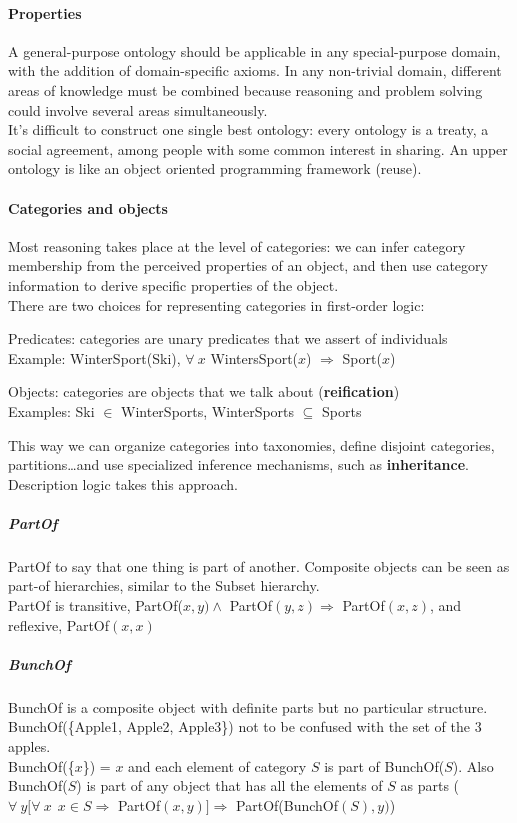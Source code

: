 \documentclass[10pt]{report}
\begin{document}
\paragraph{Properties} A general-purpose ontology should be applicable in any special-purpose domain, with the addition of domain-specific axioms. In any non-trivial domain, different areas of knowledge must be combined because reasoning and problem solving could involve several areas simultaneously.\\
It's difficult to construct one single best ontology: every ontology is a treaty, a social agreement, among people with some common interest in sharing. An upper ontology is like an object oriented programming framework (reuse).
\paragraph{Categories and objects} Most reasoning takes place at the level of categories: we can infer category membership from the perceived properties of an object, and then use category information to derive specific properties of the object.\\
There are two choices for representing categories in first-order logic:
\begin{list}{}{}
	\item Predicates: categories are unary predicates that we assert of individuals\\
	Example: WinterSport(Ski), $\forall\:x$ WintersSport($x$) $\Rightarrow$ Sport($x$)
	\item Objects: categories are objects that we talk about (\textbf{reification})\\
	Examples: Ski $\in$ WinterSports, WinterSports $\subseteq$ Sports
\end{list}
This way we can organize categories into taxonomies, define disjoint categories, partitions\ldots and use specialized inference mechanisms, such as \textbf{inheritance}. Description logic takes this approach.
\subparagraph{PartOf} PartOf to say that one thing is part of another. Composite objects can be seen as part-of hierarchies, similar to the Subset hierarchy.\\
PartOf is transitive, PartOf($x,y)\wedge$ PartOf$(y,z)\Rightarrow$ PartOf$(x,z)$, and reflexive, PartOf$(x,x)$
\subparagraph{BunchOf} BunchOf is a composite object with definite parts but no particular structure. BunchOf(\{Apple1, Apple2, Apple3\}) not to be confused with the set of the 3 apples.\\
BunchOf(\{$x$\}) = $x$ and each element of category $S$ is part of BunchOf($S$). Also BunchOf($S$) is part of any object that has all the elements of $S$ as parts ($\forall\:y[\forall\:x\:\:x\in S\Rightarrow$ PartOf$(x,y)]\Rightarrow$ PartOf(BunchOf$(S),y)$)
\end{document}
